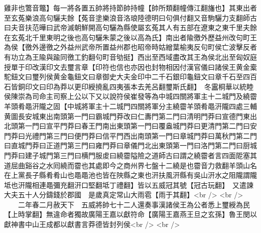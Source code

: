 雞非也鷩音鼈】每一將各置五帥將持節帥持幢【帥所類翻幢傳江翻旛也】其東出者至玄菟樂浪高句驪夫餘【菟音塗樂浪音洛琅陸德明曰句俱付翻又音駒驪力支翻師古曰夫音扶范曄曰武帝滅朝鮮開高句驪為縣使屬玄菟其人有五部在遼東之東千里夫餘在玄菟北千里東明之後也高句驪朱蒙之後以高為氏】南出者隃徼外歷益州改句町王為侯【徼外邊徼之外益州武帝所置益州郡也昭帝時姑繒葉榆夷反句町侯亡波擊反者有功立為王隃與踰同徼工釣翻句町音劬挺】西出至西域盡改其王為侯北出至匈奴庭授單于印改漢印文去璽言章【印符也信也亦因也封物相因付漢官儀曰諸侯王黄金槖駝鈕文曰璽列侯黄金龜鈕文曰章御史大夫金印中二千石銀印龜鈕文曰章千石至四百石皆銅印文曰印為莽以更印綬撓亂四夷張本去羌呂翻璽斯氏翻】　冬靁桐華以統睦侯陳崇為司命主司察上公以下又以說符侯崔發等為中城四關將軍主十二城門及繞霤羊頭肴黽汧隴之固【中城將軍主十二城門四關將軍分主繞霤羊頭肴黽汧隴四處三輔黄圖長安城東出南頭第一門曰霸城門莽改曰仁夀門第二門曰清明門莽曰宣德門東出北頭第一門曰宣平門莽曰春王門南出東頭第一門曰覆盎城門莽曰更清門第二門曰安門莽曰光禮門第三門曰便門莽曰信平門西出南頭第一門曰章城門莽曰萬秋門第二門曰直城門莽曰正道門第三門曰雍門莽曰章儀門北出東頭第一門曰洛門第二門曰厨城門莽曰建子城門第三門曰横門服䖍曰繞霤隘險之道師古曰謂之繞霤者言四面阸塞其道屈曲谿谷之水囘繞而霤也其處即今之商州界七盤十二繞是也霤音力救翻羊頭山名在上黨長子縣肴肴山也黽黽池也皆在陜縣之東也汧扶風汧縣有吳山汧水之阻隴謂隴坻也汧隴相連黽彌充翻汧口堅翻坻丁禮翻】皆以五威冠其號【冠古玩翻】　又遣諫大夫五十人分鑄錢於郡國　是歲真定常山大雨雹【雨于其翻】<br />
<br />
　　二年春二月赦天下　五威將帥七十二人還奏事漢諸侯王為公者悉上璽綬為民【上時掌翻】無違命者獨故廣陽王嘉以獻符命【廣陽王嘉燕王旦之玄孫】魯王閔以獻神書中山王成都以獻書言莽德皆封列侯<br />
<br />
